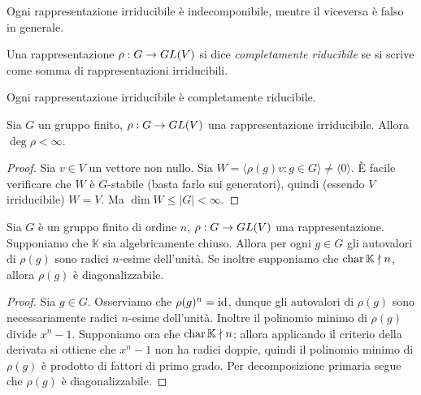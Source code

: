 \begin{remark}
Ogni rappresentazione irriducibile è indecomponibile, mentre il viceversa è falso in generale.
\end{remark}

\begin{definition}
Una rappresentazione $\rho:G\to GL(V)$ si dice \emph{completamente riducibile} se si scrive come somma di rappresentazioni irriducibili.
\end{definition}

\begin{example}
Ogni rappresentazione irriducibile è completamente riducibile.
\end{example}

\begin{proposition}
Sia $G$ un gruppo finito, $\rho:G\to GL(V)$ una rappresentazione irriducibile. Allora $\deg\rho<\infty$.
\end{proposition}
\begin{proof}
Sia $v\in V$ un vettore non nullo. Sia $W=\langle\rho(g)v:g\in G\rangle\neq\langle 0\rangle$. È facile verificare che $W$ è $G$-stabile (basta farlo sui generatori), quindi (essendo $V$ irriducibile) $W=V$. Ma $\dim W\le|G|<\infty$.
\end{proof}

\begin{proposition}
Sia $G$ è un gruppo finito di ordine $n$, $\rho:G\to GL(V)$ una rappresentazione. Supponiamo che $\mathbb{K}$ sia algebricamente chiuso. Allora per ogni $g\in G$ gli autovalori di $\rho(g)$ sono radici $n$-esime dell'unità. Se inoltre supponiamo che $\operatorname{char}\mathbb{K}\nmid n$, allora $\rho(g)$ è diagonalizzabile.
\end{proposition}
\begin{proof}
Sia $g\in G$. Osserviamo che $\rho(g)^n=\operatorname{id}$, dunque gli autovalori di $\rho(g)$ sono necessariamente radici $n$-esime dell'unità. Inoltre il polinomio minimo di $\rho(g)$ divide $x^n-1$. Supponiamo ora che $\operatorname{char}\mathbb{K}\nmid n$; allora applicando il criterio della derivata si ottiene che $x^n-1$ non ha radici doppie, quindi il polinomio minimo di $\rho(g)$ è prodotto di fattori di primo grado. Per decomposizione primaria segue che $\rho(g)$ è diagonalizzabile.
\end{proof}

